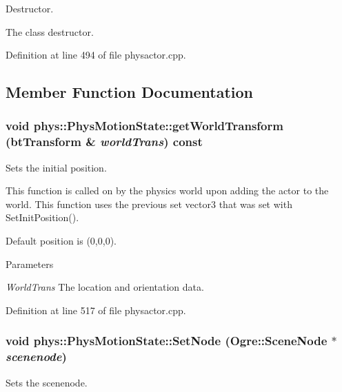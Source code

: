 Destructor. 

The class destructor. 

Definition at line 494 of file physactor.cpp.



\subsection{Member Function Documentation}
\hypertarget{classphys_1_1PhysMotionState_a80e8549fbab99150ba8f34aa3bf087d8}{
\subsubsection[{getWorldTransform}]{\setlength{\rightskip}{0pt plus 5cm}void phys::PhysMotionState::getWorldTransform (btTransform \& {\em worldTrans}) const}}
\label{dc/d0d/classphys_1_1PhysMotionState_a80e8549fbab99150ba8f34aa3bf087d8}


Sets the initial position. 

This function is called on by the physics world upon adding the actor to the world. This function uses the previous set vector3 that was set with SetInitPosition(). \par
 Default position is (0,0,0). 
\begin{DoxyParams}{Parameters}
\item[{\em WorldTrans}]The location and orientation data. \end{DoxyParams}


Definition at line 517 of file physactor.cpp.

\hypertarget{classphys_1_1PhysMotionState_a034376e768543b377430611dff323412}{
\subsubsection[{SetNode}]{\setlength{\rightskip}{0pt plus 5cm}void phys::PhysMotionState::SetNode (Ogre::SceneNode $\ast$ {\em scenenode})}}
\label{dc/d0d/classphys_1_1PhysMotionState_a034376e768543b377430611dff323412}


Sets the scenenode. 

